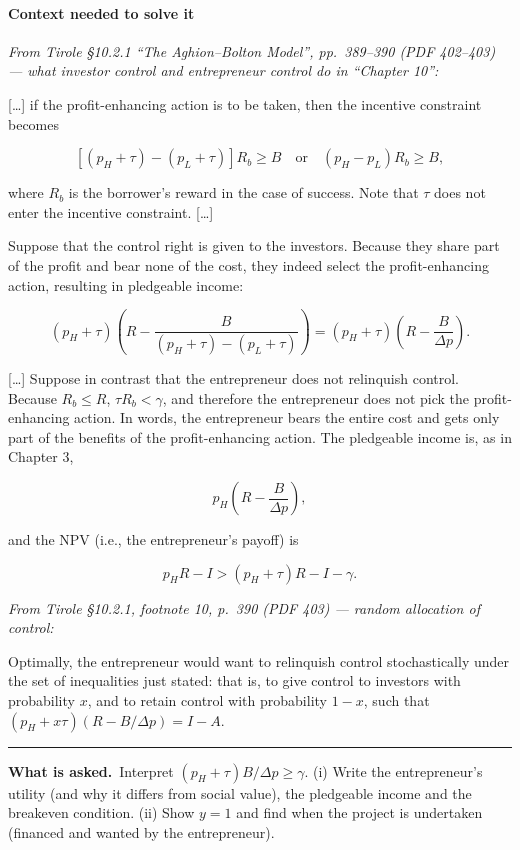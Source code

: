 \documentclass[11pt,a4paper]{article}
\newcommand{\asked}{\par\medskip\noindent\textbf{What is asked.}~}
\newcommand{\dpp}{\Delta p}
\newcommand{\stmtend}{\par\endgroup\nopagebreak\noindent\rule{\linewidth}{0.4pt}\par\medskip}
\begin{document}
\paragraph{Context needed to solve it}

\emph{From Tirole §10.2.1 ``The Aghion--Bolton Model'', pp.~389--390 (PDF 402--403) --- what
investor control and entrepreneur control do in ``Chapter 10'':}

{[}\ldots{]} if the profit-enhancing action is to be taken, then the incentive constraint becomes

\[[(p_H + \tau) - (p_L + \tau)]R_b \geqslant B \quad\text{or}\quad (p_H - p_L)R_b \geqslant B,\]

where \(R_b\) is the borrower's reward in the case of success. Note that \(\tau\) does not enter the
incentive constraint. {[}\ldots{]}

Suppose that the control right is given to the investors. Because they share part of the profit and
bear none of the cost, they indeed select the profit-enhancing action, resulting in pledgeable
income:

\[(p_H + \tau)\left(R - \frac{B}{(p_H + \tau) - (p_L + \tau)}\right) = (p_H + \tau)\left(R - \frac{B}{\Delta p}\right).\]

{[}\ldots{]} Suppose in contrast that the entrepreneur does not relinquish control. Because
\(R_b \leqslant R\), \(\tau R_b < \gamma\), and therefore the entrepreneur does not pick the
profit-enhancing action. In words, the entrepreneur bears the entire cost and gets only part of the
benefits of the profit-enhancing action. The pledgeable income is, as in Chapter 3,

\[p_H\left(R - \frac{B}{\Delta p}\right),\]

and the NPV (i.e., the entrepreneur's payoff) is

\[p_H R - I > (p_H + \tau)R - I - \gamma.\]

\emph{From Tirole §10.2.1, footnote 10, p.~390 (PDF 403) --- random allocation of control:}

Optimally, the entrepreneur would want to relinquish control stochastically under the set of
inequalities just stated: that is, to give control to investors with probability \(x\), and to
retain control with probability \(1 - x\), such that \((p_H + x\tau)(R - B/\Delta p) = I - A\).
\stmtend

\asked Interpret $(p_H+\tau)B/\dpp\ge\gamma$. (i) Write the entrepreneur's utility (and why it differs from social value), the pledgeable income and the breakeven condition. (ii) Show $y=1$ and find when the project is undertaken (financed and wanted by the entrepreneur).
\end{document}
